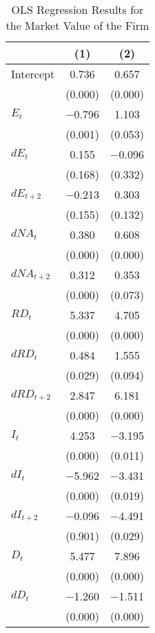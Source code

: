 {
\begin{longtable}{l*{2}{c}}
\caption{OLS Regression Results for the Market Value of the Firm \label{tab:6}}\\
\toprule\endfirsthead\midrule\endhead\midrule\endfoot\endlastfoot
&\multicolumn{1}{c}{(1)}&\multicolumn{1}{c}{(2)}\\
\midrule
Intercept   &       0.736&       0.657\\
&     (0.000)&     (0.000)\\
\addlinespace
$ E_{t}$    &    $-$0.796&       1.103\\
&     (0.001)&     (0.053)\\
\addlinespace
$ dE_{t}$   &       0.155&    $-$0.096\\
&     (0.168)&     (0.332)\\
\addlinespace
$ dE_{t+2}$ &    $-$0.213&       0.303\\
&     (0.155)&     (0.132)\\
\addlinespace
$ dNA_{t}$  &       0.380&       0.608\\
&     (0.000)&     (0.000)\\
\addlinespace
$ dNA_{t+2}$&       0.312&       0.353\\
&     (0.000)&     (0.073)\\
\addlinespace
$ RD_{t}$   &       5.337&       4.705\\
&     (0.000)&     (0.000)\\
\addlinespace
$ dRD_{t}$  &       0.484&       1.555\\
&     (0.029)&     (0.094)\\
\addlinespace
$ dRD_{t+2}$&       2.847&       6.181\\
&     (0.000)&     (0.000)\\
\addlinespace
$ I_{t}$    &       4.253&    $-$3.195\\
&     (0.000)&     (0.011)\\
\addlinespace
$ dI_{t}$   &    $-$5.962&    $-$3.431\\
&     (0.000)&     (0.019)\\
\addlinespace
$ dI_{t+2}$ &    $-$0.096&    $-$4.491\\
&     (0.901)&     (0.029)\\
\addlinespace
$ D_{t}$    &       5.477&       7.896\\
&     (0.000)&     (0.000)\\
\addlinespace
$ dD_{t}$   &    $-$1.260&    $-$1.511\\
&     (0.000)&     (0.000)\\

\end{longtable}}
